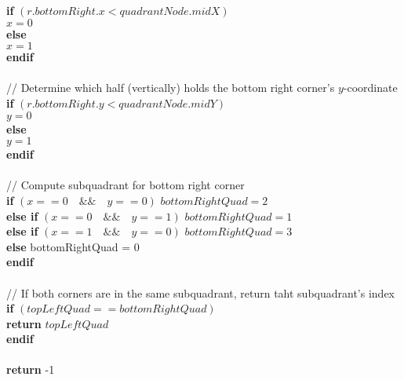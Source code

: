 \documentclass{article}
\begin{document}
	\indent \textbf{if} $(r.bottomRight.x < quadrantNode.midX)$ \\
	\indent \indent $x = 0$ \\
	\indent \textbf{else} \\
	\indent \indent $x = 1$ \\ 
	\indent \textbf{endif} \\ 
	\\
	\indent // Determine which half (vertically) holds the bottom right corner's $y$-coordinate \\
	\indent \textbf{if} $(r.bottomRight.y < quadrantNode.midY)$ \\
	\indent \indent $y = 0$ \\
	\indent \textbf{else} \\
	\indent \indent $y = 1$ \\
	\indent \textbf{endif} \\
	\\
	\indent // Compute subquadrant for bottom right corner \\
	\indent \textbf{if} $(x == 0 \quad \&\& \quad  y == 0)$ $bottomRightQuad = 2$ \\
	\indent \textbf{else if} $(x == 0  \quad \&\&  \quad y == 1)$ $bottomRightQuad = 1$ \\
	\indent \textbf{else if} $(x == 1  \quad \&\&  \quad y == 0)$ $bottomRightQuad = 3$ \\
	\indent \textbf{else} bottomRightQuad = 0 \\
	\indent \textbf{endif} \\
	\\
	\indent // If both corners are in the same subquadrant, return taht subquadrant's index \\
	\indent \textbf{if} $(topLeftQuad == bottomRightQuad)$ \\
	\indent \indent \textbf{return} $topLeftQuad$ \\
	\indent \textbf{endif} \\
	\\
	\indent \textbf{return} -1
\end{document}
